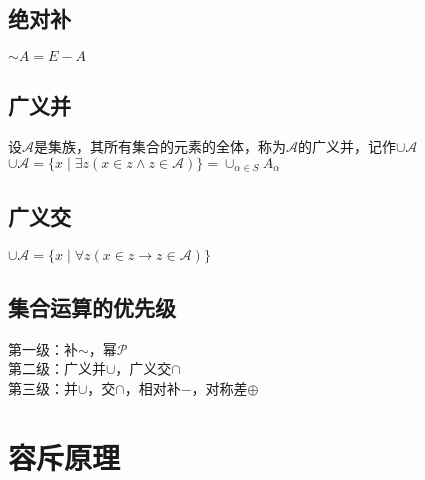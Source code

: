 \documentclass{book}
\newcommand{\A}{\forall}
\newcommand{\E}{\exists}
\newcommand{\scr}[1]{\mathscr{#1}}
\begin{document}
\subsection{绝对补}
$\sim A=E-A$
\subsection{广义并}
设$\scr{A}$是集族，其所有集合的元素的全体，称为$\scr{A}$的广义并，记作$\cup\scr{A}$\\
$\cup\scr{A}=\{x\mid \E z(x\in z\land z\in\scr{A})\}=\cup_{\alpha\in S}A_\alpha$
\subsection{广义交}
$\cup\scr{A}=\{x\mid \A z(x\in z\to z\in\scr{A})\}$
\subsection{集合运算的优先级}
\noindent
第一级：补$\sim$，幂$\scr{P}$\\
第二级：广义并$\cup$，广义交$\cap$\\
第三级：并$\cup$，交$\cap$，相对补$-$，对称差$\oplus$
\section{容斥原理}

\ifx\allfiles\undefined
\end{document}
